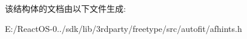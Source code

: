 \begin{DoxyCompactItemize}
\begin{tabbing}
\end{tabbing}\end{DoxyCompactItemize}


该结构体的文档由以下文件生成\+:\begin{DoxyCompactItemize}
\item 
E\+:/\+React\+O\+S-\/0../sdk/lib/3rdparty/freetype/src/autofit/afhints.\+h\end{DoxyCompactItemize}
